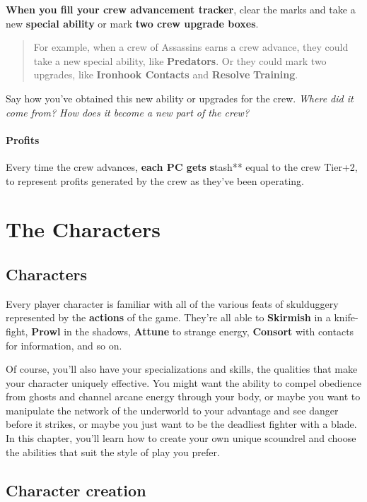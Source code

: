 \documentclass[11pt,fleqn,a5paper]{book}
\newcommand{\gameterm}[1]{\textbf{#1}}
\begin{document}
\textbf{When you fill your crew advancement tracker}, clear the marks and take a new \textbf{special ability }or mark \textbf{two crew upgrade boxes}.

\begin{quote}
	For example, when a crew of Assassins earns a crew advance, they could take a new special ability, like \textbf{Predators}. Or they could mark two upgrades, like \textbf{Ironhook Contacts} and \textbf{Resolve} \textbf{Training}.
\end{quote}

Say how you’ve obtained this new ability or upgrades for the crew. \emph{Where did it come from? How does it become a new part of the crew?}

\subsection{Profits}

Every time the crew advances, \textbf{each PC gets} \textbf{s}tash** equal to the crew Tier+2, to represent profits generated by the crew as they’ve been operating.

\part{The Characters}

\chapter{Characters}

Every player character is familiar with all of the various feats of skulduggery represented by the \textbf{actions} of the game. They’re all able to \gameterm{Skirmish}  in a knife-fight, \gameterm{Prowl}  in the shadows, \gameterm{Attune}  to strange energy, \gameterm{Consort}  with contacts for information, and so on.

Of course, you’ll also have your specializations and skills, the qualities that make your character uniquely effective. You might want the ability to compel obedience from ghosts and channel arcane energy through your body, or maybe you want to manipulate the network of the underworld to your advantage and see danger before it strikes, or maybe you just want to be the deadliest fighter with a blade. In this chapter, you’ll learn how to create your own unique scoundrel and choose the abilities that suit the style of play you prefer.

\chapter{Character creation}
\end{document}
